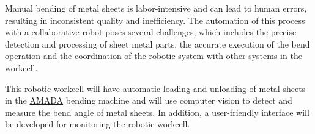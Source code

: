 Manual bending of metal sheets is labor-intensive and can 
lead to human errors, resulting in inconsistent quality
and inefficiency. 
The automation of this process with a collaborative robot poses
several challenges, which includes the precise detection and processing of sheet metal parts, the accurate execution of
the bend operation and the coordination of
the robotic system with other systems in the workcell.

This robotic workcell will have automatic loading and unloading
of metal sheets in the \hyperref[acro:AMADA]{AMADA} bending machine and will use
computer vision to detect
and measure the bend angle of metal sheets.
In addition, a user-friendly interface will be developed for
monitoring the robotic workcell.
